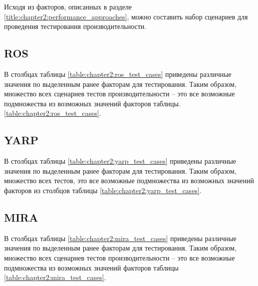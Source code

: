 Исходя из факторов, описанных в разделе \ref{title:chapter2:performance_approaches}, можно составить набор сценариев для проведения тестирования производительности.

\subsection{ROS}
В столбцах таблицы \ref{table:chapter2:ros_test_cases} приведены различные значения по выделенным ранее факторам для тестирования. Таким образом, множество всех сценариев тестов производительности -- это все возможные подмножества из возможных значений факторов таблицы. \ref{table:chapter2:ros_test_cases}.


\subsection{YARP}
В столбцах таблицы \ref{table:chapter2:yarp_test_cases} приведены различные значения по выделенным ранее факторам для тестирования. Таким образом, множество всех тестов, это все возможные подмножества из возможных значений факторов из столбцов таблицы \ref{table:chapter2:yarp_test_cases}.


\subsection{MIRA}
В столбцах таблицы \ref{table:chapter2:mira_test_cases} приведены различные значения по выделенным ранее факторам для тестирования. Таким образом, множество всех сценариев тестов производительности -- это все возможные подмножества из возможных значений факторов таблицы \ref{table:chapter2:mira_test_cases}.


%